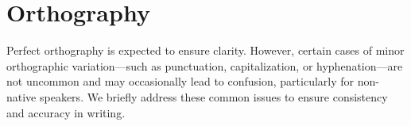 \chapter{Orthography}
\label{ch:orthography}

Perfect orthography is expected to ensure clarity. 
However, certain cases of minor orthographic variation---such as punctuation, capitalization, or hyphenation---are not uncommon and may occasionally lead to confusion, particularly for non-native speakers.
We briefly address these common issues to ensure consistency and accuracy in writing.







